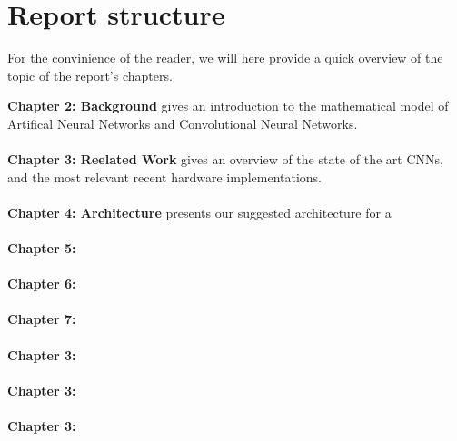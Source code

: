 \section{Report structure}

For the convinience of the reader, we will here provide a quick overview of the topic of the report's chapters. 

\textbf{Chapter 2: Background} gives an introduction to the mathematical model of Artifical Neural Networks and Convolutional Neural Networks. \\ \hfil \\ \hfil
\textbf{Chapter 3: Reelated Work} gives an overview of the state of the art CNNs, and the most relevant recent hardware implementations. \\ \hfil \\ \hfil
\textbf{Chapter 4: Architecture} presents our suggested architecture for a  \\ \hfil \\ \hfil
\textbf{Chapter 5:} \\ \hfil \\ \hfil
\textbf{Chapter 6:} \\ \hfil \\ \hfil
\textbf{Chapter 7:} \\ \hfil \\ \hfil
\textbf{Chapter 3:} \\ \hfil \\ \hfil
\textbf{Chapter 3:} \\ \hfil \\ \hfil
\textbf{Chapter 3:} \\ \hfil \\ \hfil


